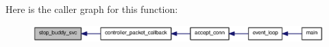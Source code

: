 Here is the caller graph for this function:\nopagebreak
\begin{figure}[H]
\begin{center}
\leavevmode
\includegraphics[width=400pt]{ctrl__buddy_8c_af36be3e8ca1253b0d412f404dcde2629_icgraph}
\end{center}
\end{figure}


